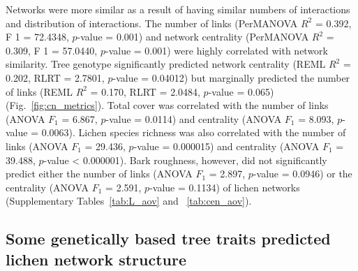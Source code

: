 \documentclass[9pt,twocolumn,twoside,lineno]{pnas-new}
\begin{document}
{%






Networks were more similar as a result of having similar numbers of
interactions and distribution of interactions. The number of links
(PerMANOVA $R^2$ = 0.392, F 1 = 72.4348, $p$-value = 0.001) and
network centrality (PerMANOVA $R^2$ = 0.309, F 1 = 57.0440, $p$-value
= 0.001) were highly correlated with network similarity.  Tree
genotype significantly predicted network centrality (REML $R^2$ =
0.202, RLRT = 2.7801, $p$-value = 0.04012) but marginally predicted
the number of links (REML $R^2$ = 0.170, RLRT = 2.0484, $p$-value =
0.065) (Fig.~\ref{fig:cn_metrics}). Total cover was correlated with
the number of links (ANOVA $F_1$ = 6.867, $p$-value = 0.0114) and
centrality (ANOVA $F_1$ = 8.093, $p$-value = 0.0063). Lichen species
richness was also correlated with the number of links (ANOVA $F_1$ =
29.436, $p$-value = 0.000015) and centrality (ANOVA $F_1$ = 39.488,
$p$-value < 0.000001). Bark roughness, however, did not significantly
predict either the number of links (ANOVA $F_1$ = 2.897, $p$-value =
0.0946) or the centrality (ANOVA $F_1$ = 2.591, $p$-value = 0.1134) of
lichen networks (Supplementary Tables~\ref{tab:L_aov} and
~\ref{tab:cen_aov}).


\subsection{Some genetically based tree traits predicted lichen
  network structure}

}
\end{document}
